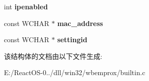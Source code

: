 \begin{DoxyCompactItemize}
\item 
\mbox{\label{structrecord__networkadapterconfig_a6e67e4194354e88fdfbe8a7ec4bc205d}} 
int {\bfseries ipenabled}
\item 
\mbox{\label{structrecord__networkadapterconfig_a427fe6b1b16c02274e9d37af92cec91a}} 
const W\+C\+H\+AR $\ast$ {\bfseries mac\+\_\+address}
\item 
\mbox{\label{structrecord__networkadapterconfig_a2cfb60f726395214906440e1d949dee5}} 
const W\+C\+H\+AR $\ast$ {\bfseries settingid}
\end{DoxyCompactItemize}


该结构体的文档由以下文件生成\+:\begin{DoxyCompactItemize}
\item 
E\+:/\+React\+O\+S-\/0../dll/win32/wbemprox/builtin.\+c\end{DoxyCompactItemize}
